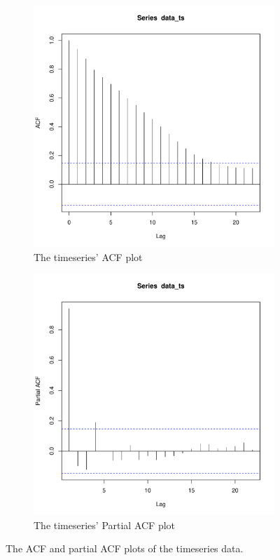 \documentclass[12pt,a4paper,twoside]{article}
\begin{document}
\begin{figure}[!ht]
    \begin{subfigure}{0.5\textwidth}
        \centering
        \includegraphics[width=\linewidth]{img/acf_plot.pdf}
        \caption{The timeseries' ACF plot}
        \label{fig:timeseriesacfplot}
    \end{subfigure}
    \begin{subfigure}{0.5\textwidth}
        \centering
        \includegraphics[width=\linewidth]{img/pacf_plot.pdf}
        \caption{The timeseries' Partial ACF plot}
        \label{fig:timeseriespacfplot}
    \end{subfigure}
    \caption{The ACF and partial ACF plots of the timeseries data.}
    \label{fig:timeseriesacfpacfplots}
\end{figure}
\end{document}
